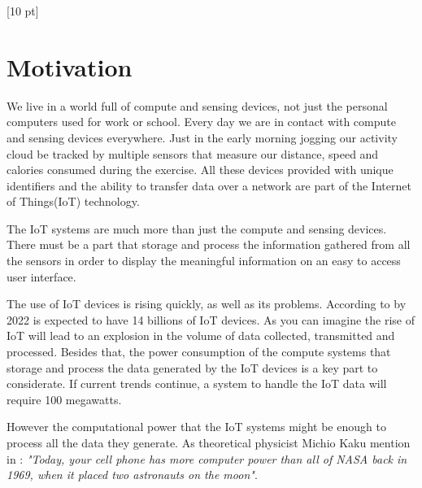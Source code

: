 \titleformat{\chapter}{\Huge\bfseries}{\thechapter}{0 pt}{\rule{340 pt}{3 pt}\\}
\titlespacing{\chapter}{100 pt}{-25 pt}{40 pt}[10 pt]	
\pagestyle{fancy}
\fancyhead[RO,RE]{\thepage}
\fancyfoot[CO,CE]{}

\chapter*{Motivation}

\normalsize
\noindent

We live in a world full of compute and sensing  devices, not just the personal
computers used for work or school. Every day we are in contact with compute
and sensing devices everywhere. Just in the early morning jogging our activity
cloud be tracked by multiple sensors that measure our distance, speed and calories
consumed during the exercise. All these devices provided with unique identifiers 
and the ability to transfer data over a network are part of the Internet of
Things(IoT) technology. 

The IoT systems are much more than just the compute and sensing devices. There
must be a part that storage and process the information gathered from all the
sensors  in order to display the meaningful information on an easy to access
user interface. 

The use of IoT devices is rising quickly, as well as its problems. According to
\cite{Benkhelifa} by 2022 is expected to have 14 billions of IoT devices. As
you can imagine the rise of IoT will lead to an explosion in the volume of data
collected, transmitted and processed. Besides that, the power consumption of
the compute systems that storage and process the data generated by the IoT
devices is a key part to considerate. If current trends continue, a system to
handle the IoT data will require 100 megawatts. \cite{Xizhou}

However the computational power that the IoT systems might be enough to
process all the data they generate. As  theoretical physicist Michio Kaku
mention in \cite{Michio}: \textit{"Today, your cell phone has more computer
power than all of NASA back in 1969, when it placed two astronauts on the
moon"}.

